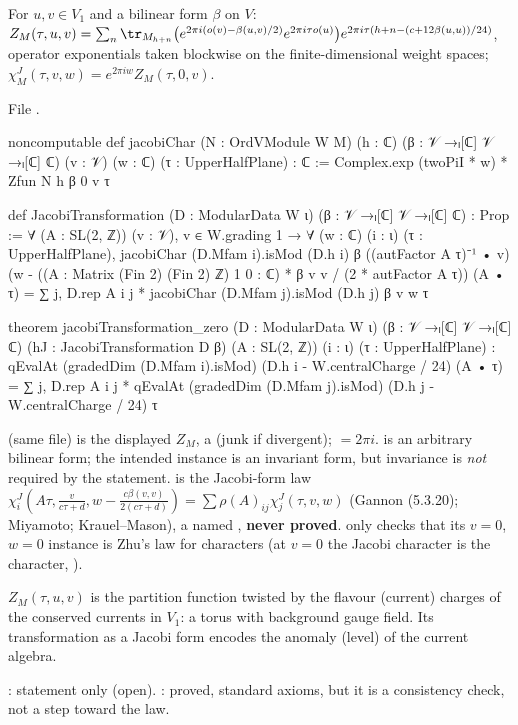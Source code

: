 \begin{definition}\label{l14:def:jacobi}
For $u,v\in V_1$ and a bilinear form $\beta$ on $V$:
$Z_M(\tau,u,v) = \sum_n\tr_{M_{h+n}}\bigl(e^{2\pi i(o(v)-\beta(u,v)/2)}e^{2\pi i\tau o(u)}\bigr)e^{2\pi i\tau(h+n-(c+12\beta(u,u))/24)}$,
operator exponentials taken blockwise on the finite-dimensional weight spaces; $\chi^J_M(\tau,v,w) = e^{2\pi iw}Z_M(\tau,0,v)$.
\end{definition}
\noindent File .
\begin{leancode}
noncomputable def jacobiChar (N : OrdVModule W M) (h : ℂ) (β : 𝒱 →ₗ[ℂ] 𝒱 →ₗ[ℂ] ℂ) (v : 𝒱) (w : ℂ)
    (τ : UpperHalfPlane) : ℂ :=
  Complex.exp (twoPiI * w) * Zfun N h β 0 v τ

def JacobiTransformation (D : ModularData W ι) (β : 𝒱 →ₗ[ℂ] 𝒱 →ₗ[ℂ] ℂ) : Prop :=
  ∀ (A : SL(2, ℤ)) (v : 𝒱), v ∈ W.grading 1 → ∀ (w : ℂ) (i : ι) (τ : UpperHalfPlane),
    jacobiChar (D.Mfam i).isMod (D.h i) β ((autFactor A τ)⁻¹ • v)
        (w - ((A : Matrix (Fin 2) (Fin 2) ℤ) 1 0 : ℂ) * β v v / (2 * autFactor A τ)) (A • τ)
      = ∑ j, D.rep A i j * jacobiChar (D.Mfam j).isMod (D.h j) β v w τ

theorem jacobiTransformation_zero (D : ModularData W ι) (β : 𝒱 →ₗ[ℂ] 𝒱 →ₗ[ℂ] ℂ)
    (hJ : JacobiTransformation D β) (A : SL(2, ℤ)) (i : ι) (τ : UpperHalfPlane) :
    qEvalAt (gradedDim (D.Mfam i).isMod) (D.h i - W.centralCharge / 24) (A • τ)
      = ∑ j, D.rep A i j * qEvalAt (gradedDim (D.Mfam j).isMod) (D.h j - W.centralCharge / 24) τ
\end{leancode}
\begin{dictionary}
 (same file) is the displayed $Z_M$, a  (junk if divergent);  $=2\pi i$.  is an
arbitrary bilinear form; the intended instance is an invariant form, but invariance is \emph{not} required by the statement.
 is the Jacobi-form law $\chi^J_i(A\tau,\frac v{c\tau+d},w-\frac{c\beta(v,v)}{2(c\tau+d)}) =
\sum\rho(A)_{ij}\chi^J_j(\tau,v,w)$ (Gannon (5.3.20); Miyamoto; Krauel--Mason), a named , \textbf{never proved}.
 only checks that its $v=0$, $w=0$ instance is Zhu's law for characters (at $v=0$ the Jacobi
character is the character, ).
\end{dictionary}
\begin{physics}
$Z_M(\tau,u,v)$ is the partition function twisted by the flavour (current) charges of the conserved currents in $V_1$: a
torus with background gauge field. Its transformation as a Jacobi form encodes the anomaly (level) of the current algebra.
\end{physics}
\begin{status}
: statement only (open). : proved, standard axioms, but it is a
consistency check, not a step toward the law.
\end{status}

